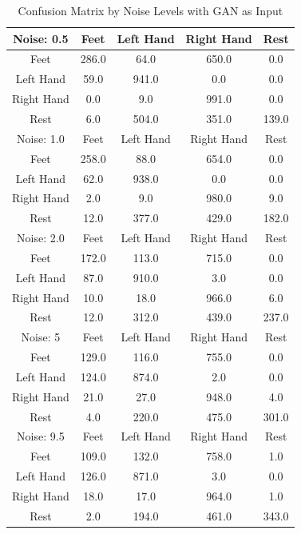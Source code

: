 \begin{table}[!htbp]
    \centering
    \begin{tabular}{|c||c|c|c|c|}
        \hline
		Noise: 0.5 & Feet & Left Hand & Right Hand & Rest \\
        \hline
        \hline
        Feet & 286.0 & 64.0 & 650.0 & 0.0 \\
        \hline
        Left Hand & 59.0 & 941.0 & 0.0 & 0.0 \\
        \hline
        Right Hand & 0.0 & 9.0 & 991.0 & 0.0 \\
        \hline
        Rest & 6.0 & 504.0 & 351.0 & 139.0 \\
        \hline
        \hline
        \hline
		Noise: 1.0 & Feet & Left Hand & Right Hand & Rest \\
        \hline
        \hline
        Feet & 258.0 & 88.0 & 654.0 & 0.0 \\
        \hline
        Left Hand & 62.0 & 938.0 & 0.0 & 0.0 \\
        \hline
        Right Hand & 2.0 & 9.0 & 980.0 & 9.0 \\
        \hline
        Rest & 12.0 & 377.0 & 429.0 & 182.0 \\
        \hline
        \hline
        \hline
		Noise: 2.0 & Feet & Left Hand & Right Hand & Rest \\
        \hline
        \hline
        Feet & 172.0 & 113.0 & 715.0 & 0.0 \\
        \hline
        Left Hand & 87.0 & 910.0 & 3.0 & 0.0 \\
        \hline
        Right Hand & 10.0 & 18.0 & 966.0 & 6.0 \\
        \hline
        Rest & 12.0 & 312.0 & 439.0 & 237.0 \\
        \hline
        \hline
        \hline
		Noise: 5 & Feet & Left Hand & Right Hand & Rest \\
        \hline
        \hline
        Feet & 129.0 & 116.0 & 755.0 & 0.0 \\
        \hline
        Left Hand & 124.0 & 874.0 & 2.0 & 0.0 \\
        \hline
        Right Hand & 21.0 & 27.0 & 948.0 & 4.0 \\
        \hline
        Rest & 4.0 & 220.0 & 475.0 & 301.0 \\
        \hline
        \hline
        \hline
		Noise: 9.5 & Feet & Left Hand & Right Hand & Rest \\
        \hline
        \hline
        Feet & 109.0 & 132.0 & 758.0 & 1.0 \\
        \hline
        Left Hand & 126.0 & 871.0 & 3.0 & 0.0 \\
        \hline
        Right Hand & 18.0 & 17.0 & 964.0 & 1.0 \\
        \hline
        Rest & 2.0 & 194.0 & 461.0 & 343.0 \\
        \hline
    \end{tabular}
    \caption{Confusion Matrix by Noise Levels with GAN as Input}\label{tab:confusion_matrix_gan_noise}
\end{table}

